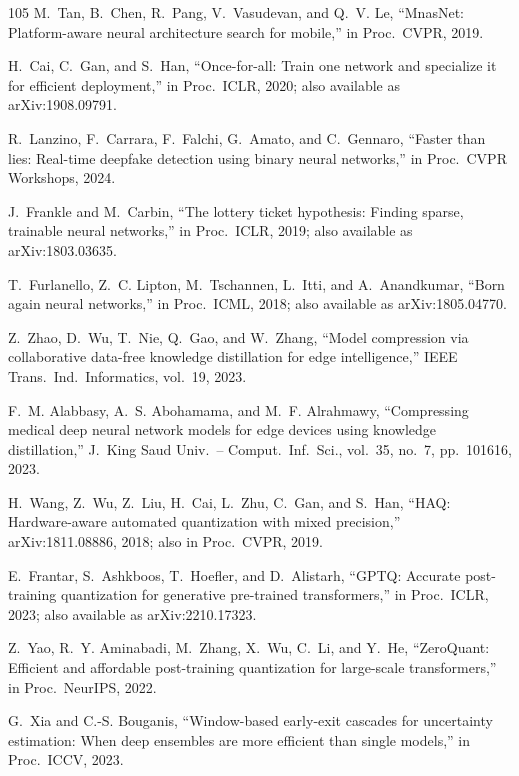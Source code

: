 \begin{thebibliography}{105}
M.~Tan, B.~Chen, R.~Pang, V.~Vasudevan, and Q.~V. Le, ``MnasNet: Platform-aware neural architecture search for mobile,'' in Proc.\ CVPR, 2019.

H.~Cai, C.~Gan, and S.~Han, ``Once-for-all: Train one network and specialize it for efficient deployment,'' in Proc.\ ICLR, 2020; also available as arXiv:1908.09791.

R.~Lanzino, F.~Carrara, F.~Falchi, G.~Amato, and C.~Gennaro, ``Faster than lies: Real-time deepfake detection using binary neural networks,'' in Proc.\ CVPR Workshops, 2024.

J.~Frankle and M.~Carbin, ``The lottery ticket hypothesis: Finding sparse, trainable neural networks,'' in Proc.\ ICLR, 2019; also available as arXiv:1803.03635.

T.~Furlanello, Z.~C. Lipton, M.~Tschannen, L.~Itti, and A.~Anandkumar, ``Born again neural networks,'' in Proc.\ ICML, 2018; also available as arXiv:1805.04770.

Z.~Zhao, D.~Wu, T.~Nie, Q.~Gao, and W.~Zhang, ``Model compression via collaborative data-free knowledge distillation for edge intelligence,'' IEEE Trans.\ Ind.\ Informatics, vol.~19, 2023.

F.~M. Alabbasy, A.~S. Abohamama, and M.~F. Alrahmawy, ``Compressing medical deep neural network models for edge devices using knowledge distillation,'' J.\ King Saud Univ.\ -- Comput.\ Inf.\ Sci., vol.~35, no.~7, pp.~101616, 2023.

H.~Wang, Z.~Wu, Z.~Liu, H.~Cai, L.~Zhu, C.~Gan, and S.~Han, ``HAQ: Hardware-aware automated quantization with mixed precision,'' arXiv:1811.08886, 2018; also in Proc.\ CVPR, 2019.

E.~Frantar, S.~Ashkboos, T.~Hoefler, and D.~Alistarh, ``GPTQ: Accurate post-training quantization for generative pre-trained transformers,'' in Proc.\ ICLR, 2023; also available as arXiv:2210.17323.

Z.~Yao, R.~Y. Aminabadi, M.~Zhang, X.~Wu, C.~Li, and Y.~He, ``ZeroQuant: Efficient and affordable post-training quantization for large-scale transformers,'' in Proc.\ NeurIPS, 2022.

G.~Xia and C.-S. Bouganis, ``Window-based early-exit cascades for uncertainty estimation: When deep ensembles are more efficient than single models,'' in Proc.\ ICCV, 2023.


\end{thebibliography}
